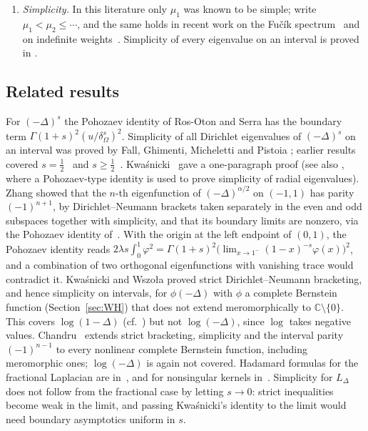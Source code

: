 \documentclass[11pt]{amsart}
\newcommand{\C}{\mathbb{C}}
\newcommand{\LD}{L_\Delta}
\theoremstyle{definition}
\theoremstyle{remark}
\numberwithin{equation}{section}
\begin{document}
\begin{enumerate}
\item \emph{Simplicity.} In this literature only $\mu_1$ was known to be simple; \cite{CW19,HJSS25} write $\mu_1<\mu_2\le\cdots$, and the same holds in recent work on the Fu\v{c}\'ik spectrum~\cite{AM26} and on indefinite weights~\cite{AMV26}. Simplicity of every eigenvalue on an interval is proved in \cite[Cor.~2.3]{BT26}.
\end{enumerate}

\subsection{Related results}
For $(-\Delta)^s$ the Pohozaev identity of Ros-Oton and Serra \cite[Thm.~1.1]{RS14} has the boundary term $\Gamma(1+s)^2(u/\delta_\Omega^s)^2$. Simplicity of all Dirichlet eigenvalues of $(-\Delta)^s$ on an interval was proved by Fall, Ghimenti, Micheletti and Pistoia \cite[Cor.~2]{FGMP23}; earlier results covered $s=\frac12$~\cite{KKMS10} and $s\ge\frac12$~\cite{Kw12}. Kwa\'snicki~\cite{Kw23} gave a one-paragraph proof (see also \cite[\S4.1]{DFW24}, where a Pohozaev-type identity is used to prove simplicity of radial eigenvalues). Zhang \cite[Lemma~6.1]{Zh26} showed that the $n$-th eigenfunction of $(-\Delta)^{\alpha/2}$ on $(-1,1)$ has parity $(-1)^{n+1}$, by Dirichlet--Neumann brackets taken separately in the even and odd subspaces together with simplicity, and that its boundary limits are nonzero, via the Pohozaev identity of~\cite{RS14}. With the origin at the left endpoint of $(0,1)$, the Pohozaev identity reads $2\lambda s\int_0^1\varphi^2=\Gamma(1+s)^2\bigl(\lim_{x\to1^-}(1-x)^{-s}\varphi(x)\bigr)^2$, and a combination of two orthogonal eigenfunctions with vanishing trace would contradict it. Kwa\'snicki and Wszo{\l}a \cite[Thm.~1.2]{KW26} proved strict Dirichlet--Neumann bracketing, and hence simplicity on intervals, for $\phi(-\Delta)$ with $\phi$ a complete Bernstein function (Section~\ref{sec:WH}) that does not extend meromorphically to $\C\setminus\{0\}$. This covers $\log(1-\Delta)$ (cf.~\cite{Feu23}) but not $\log(-\Delta)$, since $\log$ takes negative values. Chandru~\cite{Ch26} extends strict bracketing, simplicity and the interval parity $(-1)^{n-1}$ to every nonlinear complete Bernstein function, including meromorphic ones; $\log(-\Delta)$ is again not covered. Hadamard formulas for the fractional Laplacian are in~\cite{DFW21,DFW24,DS26}, and for nonsingular kernels in~\cite{BPS24}. Simplicity for $\LD$ does not follow from the fractional case by letting $s\to0$: strict inequalities become weak in the limit, and passing Kwa\'snicki's identity to the limit would need boundary asymptotics uniform in $s$.
\end{document}

